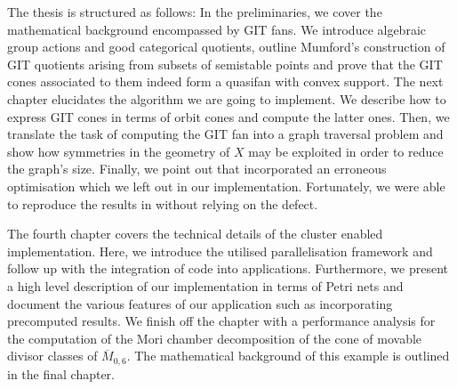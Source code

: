 The thesis is structured as follows: In the preliminaries, we cover the mathematical background encompassed by GIT fans. We introduce algebraic group actions and good categorical quotients, outline Mumford's construction of GIT quotients arising from subsets of semistable points and prove that the GIT cones associated to them indeed form a quasifan with convex support. The next chapter elucidates the algorithm we are going to implement. We describe how to express GIT cones in terms of orbit cones and compute the latter ones. Then, we translate the task of computing the GIT fan into a graph traversal problem and show how symmetries in the geometry of $X$ may be exploited in order to reduce the graph's size. Finally, we point out that \cite{gitfan_symmetry} incorporated an erroneous optimisation which we left out in our implementation. Fortunately, we were able to reproduce the results in \cite{gitfan_symmetry} without relying on the defect.

The fourth chapter covers the technical details of the cluster enabled implementation. Here, we introduce the utilised parallelisation framework \gpispace{} and follow up with the integration of \singular{} code into \gpispace{} applications. Furthermore, we present a high level description of our implementation in terms of Petri nets and document the various features of our application such as incorporating precomputed results. We finish off the chapter with a performance analysis for the computation of the Mori chamber decomposition of the cone of movable divisor classes of $\overline{M}_{0,6}$. The mathematical background of this example is outlined in the final chapter.
